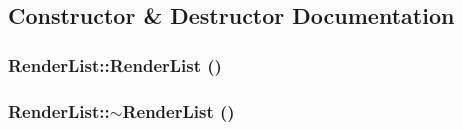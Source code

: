 \subsection{Constructor \& Destructor Documentation}
\hypertarget{class_robot_model_1_1_render_list_a98651fa6cd408cce14d6d245cd95fde4}{
\subsubsection[{RenderList}]{\setlength{\rightskip}{0pt plus 5cm}RenderList::RenderList ()}}
\label{class_robot_model_1_1_render_list_a98651fa6cd408cce14d6d245cd95fde4}
\hypertarget{class_robot_model_1_1_render_list_ae66a9f72d814771e42d7e50946053ef7}{
\subsubsection[{$\sim$RenderList}]{\setlength{\rightskip}{0pt plus 5cm}RenderList::$\sim$RenderList ()}}
\label{class_robot_model_1_1_render_list_ae66a9f72d814771e42d7e50946053ef7}


